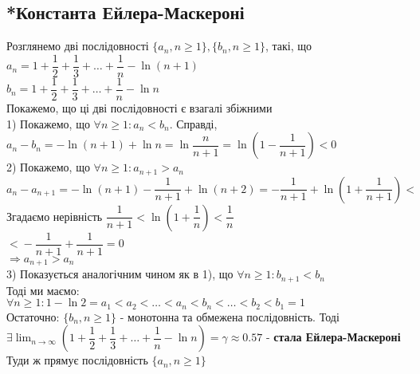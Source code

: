 \documentclass[a4paper, 14pt]{extarticle}
\def\huge{\displaystyle}
\def\bigline{\vspace{5mm}\\}
\def\bigline{\vspace{5mm}\\}
\begin{document}
	\subsection{*Константа Ейлера-Маскероні}
	Розглянемо дві послідовності $\{a_n, n \geq 1\}, \{b_n, n \geq 1\}$, такі, що\\
	$a_n = 1 + \dfrac{1}{2} + \dfrac{1}{3} + \dots + \dfrac{1}{n} - \ln (n+1)$\\
	$b_n = 1 + \dfrac{1}{2} + \dfrac{1}{3} + \dots + \dfrac{1}{n} - \ln n$\\
	Покажемо, що ці дві послідовності є взагалі збіжними\\
	1) Покажемо, що $\forall n \geq 1: a_n < b_n$. Справді,\\
	$a_n - b_n = - \ln (n+1) + \ln n = \ln \dfrac{n}{n+1} = \ln \left(1 - \dfrac{1}{n+1} \right) < 0$
	\bigline
	2) Покажемо, що $\forall n \geq 1: a_{n+1} > a_n$\\
	$a_n - a_{n+1} = - \ln(n+1) -\dfrac{1}{n+1} + \ln(n+2) = - \dfrac{1}{n+1} + \ln \left( 1 + \dfrac{1}{n+1} \right) \boxed{<}$
	Згадаємо нерівність $\dfrac{1}{n+1} < \ln \left(1 + \dfrac{1}{n} \right) < \dfrac{1}{n}$\\
	$\boxed{<} -\dfrac{1}{n+1} + \dfrac{1}{n+1} = 0$\\
	$\Rightarrow a_{n+1} > a_n$
	\bigline
	3) Показується аналогічним чином як в 1), що $\forall n \geq 1: b_{n+1} < b_n$\\
	Тоді ми маємо:\\
	$\forall n \geq 1: 1 - \ln 2 = a_1 < a_2 < \dots < a_n < b_n < \dots < b_2 < b_1 = 1$\\
	Остаточно: $\{b_n, n \geq 1\}$ - монотонна та обмежена послідовність. Тоді\\
	$\exists \huge \lim_{n \to \infty} \left(1 + \dfrac{1}{2} + \dfrac{1}{3} + \dots + \dfrac{1}{n} - \ln n \right) = \gamma \approx 0.57$ - \textbf{стала Ейлера-Маскероні}\\
	Туди ж прямує послідовність $\{a_n, n \geq 1\}$
	\bigline
	
\end{document}
